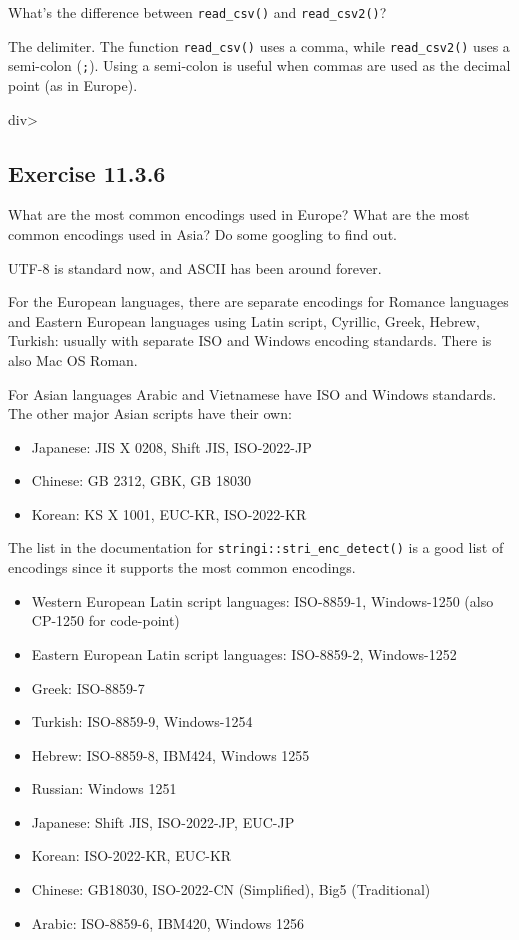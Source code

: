 \documentclass[]{book}
\providecommand{\tightlist}{%
  \setlength{\itemsep}{0pt}\setlength{\parskip}{0pt}}
\theoremstyle{plain}
\theoremstyle{remark}
\begin{document}
What's the difference between \texttt{read\_csv()} and
\texttt{read\_csv2()}?

The delimiter. The function \texttt{read\_csv()} uses a comma, while
\texttt{read\_csv2()} uses a semi-colon (\texttt{;}). Using a semi-colon
is useful when commas are used as the decimal point (as in Europe).

div\textgreater{}

\hypertarget{exercise-11.3.6}{%
\subsection*{\texorpdfstring{Exercise
{11.3.6}}{Exercise 11.3.6}}\label{exercise-11.3.6}}

What are the most common encodings used in Europe? What are the most
common encodings used in Asia? Do some googling to find out.

UTF-8 is standard now, and ASCII has been around forever.

For the European languages, there are separate encodings for Romance
languages and Eastern European languages using Latin script, Cyrillic,
Greek, Hebrew, Turkish: usually with separate ISO and Windows encoding
standards. There is also Mac OS Roman.

For Asian languages Arabic and Vietnamese have ISO and Windows
standards. The other major Asian scripts have their own:

\begin{itemize}
\tightlist
\item
  Japanese: JIS X 0208, Shift JIS, ISO-2022-JP
\item
  Chinese: GB 2312, GBK, GB 18030
\item
  Korean: KS X 1001, EUC-KR, ISO-2022-KR
\end{itemize}

The list in the documentation for \texttt{stringi::stri\_enc\_detect()}
is a good list of encodings since it supports the most common encodings.

\begin{itemize}
\tightlist
\item
  Western European Latin script languages: ISO-8859-1, Windows-1250
  (also CP-1250 for code-point)
\item
  Eastern European Latin script languages: ISO-8859-2, Windows-1252
\item
  Greek: ISO-8859-7
\item
  Turkish: ISO-8859-9, Windows-1254
\item
  Hebrew: ISO-8859-8, IBM424, Windows 1255
\item
  Russian: Windows 1251
\item
  Japanese: Shift JIS, ISO-2022-JP, EUC-JP
\item
  Korean: ISO-2022-KR, EUC-KR
\item
  Chinese: GB18030, ISO-2022-CN (Simplified), Big5 (Traditional)
\item
  Arabic: ISO-8859-6, IBM420, Windows 1256
\end{itemize}
\end{document}
